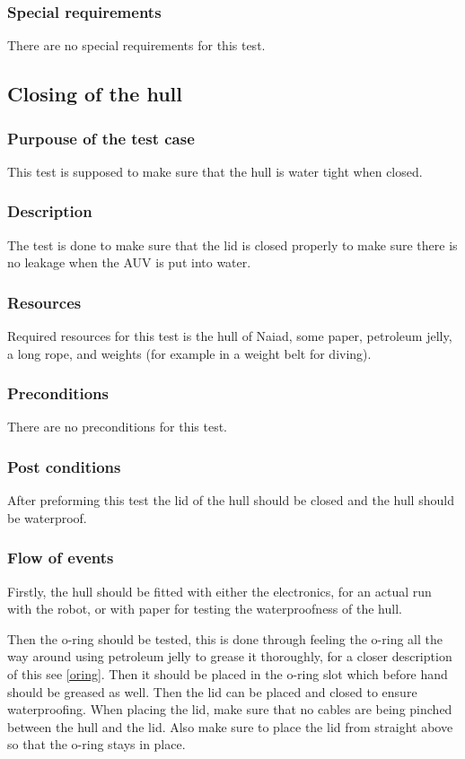 \documentclass[10pt,a4paper]{article}
\begin{document}
\subsubsection*{Special requirements}
There are no special requirements for this test. 

\subsection{Closing of the hull}
\label{Hulltest}
\subsubsection*{Purpouse of the test case}
This test is supposed to make sure that the hull is water tight when closed. 
\subsubsection*{Description}
The test is done to make sure that the lid is closed properly to make sure there is no leakage when the AUV is put into water. 
\subsubsection*{Resources}
Required resources for this test is the hull of Naiad, some paper, petroleum jelly, a long rope, and weights (for example in a weight belt for diving). 
\subsubsection*{Preconditions}
There are no preconditions for this test. 
\subsubsection*{Post conditions}
After preforming this test the lid of the hull should be closed and the hull should be waterproof. 
\subsubsection*{Flow of events}
Firstly, the hull should be fitted with either the electronics, for an actual run with the robot, or with paper for testing the waterproofness of the hull. 

Then the o-ring should be tested, this is done through feeling the o-ring all the way around using petroleum jelly to grease it thoroughly, for a closer description of this see \ref{oring}. Then it should be placed in the o-ring slot which before hand should be greased as well. Then the lid can be placed and closed to ensure waterproofing. When placing the lid, make sure that no cables are being pinched between the hull and the lid. Also make sure to place the lid from straight above so that the o-ring stays in place. 
\end{document}

